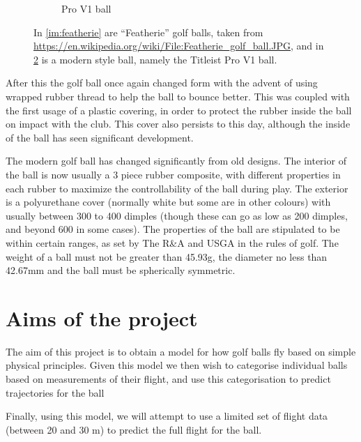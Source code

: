 \begin{figure}[h]
\begin{subfigure}[b]{0.4\textwidth}
\caption{Pro V1 ball}
\label{im:pv1}
\end{subfigure}
\caption[Images of golf balls]{In \ref{im:featherie} are ``Featherie'' golf balls, taken from 
\url{https://en.wikipedia.org/wiki/File:Featherie_golf_ball.JPG}, 
and in \ref{im:pv1} is a modern style ball, namely the Titleist Pro V1 ball.}
\end{figure}

After this the golf ball once again changed form with the advent of using wrapped rubber
thread to help the ball to bounce better. This was coupled with the first usage of a plastic 
covering, in order to protect the rubber inside the ball on impact with the
club. This cover also persists to this day, although the inside of the ball has seen significant
development.

The modern golf ball has changed significantly from old designs. The interior of the ball is
now usually a 3 piece rubber composite, with different properties in each rubber to maximize
the controllability of the ball during play. The exterior is a polyurethane cover (normally white
but some are in other colours) with usually between 300 to 400 dimples (though these can go as 
low as 200 dimples, and beyond 600 in some cases). The properties of the ball are stipulated to be
within certain ranges, as set by The R\&A and USGA in the rules of golf. The weight of a ball must
not be greater than 45.93g, the diameter no less than 42.67mm and the ball must be spherically symmetric.

\section{Aims of the project}

The aim of this project is to obtain a model for how golf balls fly based on simple physical principles.
Given this model we then wish to categorise individual balls based on measurements of their flight, and
use this categorisation to predict trajectories for the ball 

Finally, using this model, we will attempt to use a limited set of flight data (between 20 and 30 m)
to predict the full flight for the ball.
